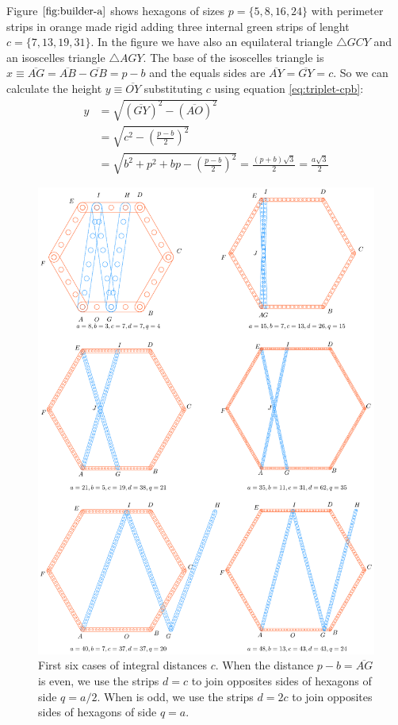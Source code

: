 \documentclass[11pt]{article}
\begin{document}
Figure $\ref{fig:builder-a}$ shows hexagons of sizes $p = \{5,8,16,24\}$ with perimeter strips in orange made rigid adding three internal green strips of lenght $c = \{7,13,19,31\}$. In the figure we have also an equilateral triangle $\triangle{GCY}$ and an isoscelles triangle $\triangle{AGY}$. The base of the isoscelles triangle is $x \equiv \overline{AG} = \overline{AB} - \overline{GB} = p - b$ and the equals sides are $\overline{AY} = \overline{GY} = c$. So we can calculate the height $y \equiv \overline{OY}$ substituting $c$ using equation \ref{eq:triplet-cpb}:
\begin{align}
y &= \sqrt{(\overline{GY})^2 - (\overline{AO})^2} \nonumber\\
 &= \sqrt{c^2 - \left(\frac{p - b}2\right)^2} \nonumber\\
 &= \sqrt{b^2 + p^2 + bp - \left(\frac{p-b}2\right)^2}
  = \frac{(p + b)\sqrt3}2 = \frac{a\sqrt3}2
\end{align}



\begin{figure}[H]
\centering
\includegraphics[scale=0.8]{build/hexa-builder-b}
\caption{First six cases of integral distances $c$. When the distance $p-b = \overline{AG}$ is even, we use the strips $d = c$ to join opposites sides of hexagons of side $q = a/2$. When is odd, we use the strips $d = 2c$ to join opposites sides of hexagons of side $q = a$.}
\label{fig:builder-b}
\end{figure}
\end{document}
